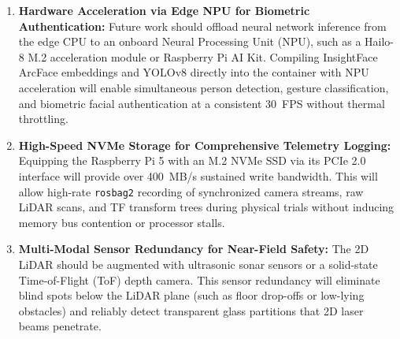 \begin{enumerate}
    \item \textbf{Hardware Acceleration via Edge NPU for Biometric Authentication:} Future work should offload neural network inference from the edge CPU to an onboard Neural Processing Unit (NPU), such as a Hailo-8 M.2 acceleration module or Raspberry Pi AI Kit. Compiling InsightFace ArcFace embeddings and YOLOv8 directly into the container with NPU acceleration will enable simultaneous person detection, gesture classification, and biometric facial authentication at a consistent 30~FPS without thermal throttling.
    \item \textbf{High-Speed NVMe Storage for Comprehensive Telemetry Logging:} Equipping the Raspberry Pi 5 with an M.2 NVMe SSD via its PCIe 2.0 interface will provide over 400~MB/s sustained write bandwidth. This will allow high-rate \texttt{rosbag2} recording of synchronized camera streams, raw LiDAR scans, and TF transform trees during physical trials without inducing memory bus contention or processor stalls.
    \item \textbf{Multi-Modal Sensor Redundancy for Near-Field Safety:} The 2D LiDAR should be augmented with ultrasonic sonar sensors or a solid-state Time-of-Flight (ToF) depth camera. This sensor redundancy will eliminate blind spots below the LiDAR plane (such as floor drop-offs or low-lying obstacles) and reliably detect transparent glass partitions that 2D laser beams penetrate.
\end{enumerate}
